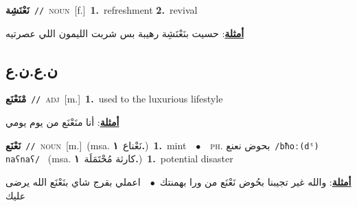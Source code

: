 \documentclass[10pt,a4paper,twoside]{article} %
\begin{document}
\begin{multicols}{2}
{\setlength\topsep{0pt}\textbf{\foreignlanguage{arabic}{نَعْنَشِة}}\ {\color{gray}\texttt{//}\color{black}}\ \textsc{noun}\ [f.]\ \textbf{1.}~refreshment  \textbf{2.}~revival\  \begin{flushright}\color{gray}\foreignlanguage{arabic}{\textbf{\underline{\foreignlanguage{arabic}{أمثلة}}}: حسيت بنَعْنَشِة رهيبة بس شربت الليمون اللي عصرتيه}\end{flushright}\color{black}} \vspace{2mm}

\vspace{-3mm}
\subsection*{\color{blue}\foreignlanguage{arabic}{ن.ع.ن.ع}\color{blue}{}} 

{\setlength\topsep{0pt}\textbf{\foreignlanguage{arabic}{مْنَعْنَع}}\ {\color{gray}\texttt{//}\color{black}}\ \textsc{adj}\ [m.]\ \textbf{1.}~used to the luxurious lifestyle\  \begin{flushright}\color{gray}\foreignlanguage{arabic}{\textbf{\underline{\foreignlanguage{arabic}{أمثلة}}}: أنا منَعْنَع من يوم يومي}\end{flushright}\color{black}} \vspace{2mm}

{\setlength\topsep{0pt}\textbf{\foreignlanguage{arabic}{نَعْنَع}}\ {\color{gray}\texttt{//}\color{black}}\ \textsc{noun}\ [m.]\ \color{gray}(msa. \foreignlanguage{arabic}{نَعْناع}~\foreignlanguage{arabic}{\textbf{١.}})\color{black}\ \textbf{1.}~mint\ \ $\bullet$\ \ \textsc{ph.} \color{gray} \foreignlanguage{arabic}{بحوض نعنع}\color{black}\ {\color{gray}\texttt{/{\sffamily bħoː(dˤ) naʕnaʕ}/}\color{black}}\ \color{gray} (msa. \foreignlanguage{arabic}{كارثة مُحْتَمَلَة}~\foreignlanguage{arabic}{\textbf{١.}})\color{black}\ \textbf{1.}~potential disaster\  \begin{flushright}\color{gray}\foreignlanguage{arabic}{\textbf{\underline{\foreignlanguage{arabic}{أمثلة}}}: والله غير تجيبنا بحُوض نَعْنَع من ورا بهمنتك\ $\bullet$\ \  اعملي بقرج شاي بنَعْنَع الله يرضى عليك}\end{flushright}\color{black}} \vspace{2mm}


\end{multicols}
\end{document}
